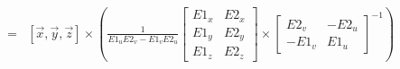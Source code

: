 \documentclass[12pt]{article}
\begin{document}
\begin{eqnarray*}
            & = &
            \left[ \overrightarrow{x}, \overrightarrow{y}, \overrightarrow{z} \right]       
            \times
            \left(
                \frac{1}{E1_uE2_v-E1_vE2_u}
                \left[ \begin{array}{cc}
                    E1_x & E2_x \\
                    E1_y & E2_y \\
                    E1_z & E2_z
                \end{array} \right]
                \times
                \left[ \begin{array}{cc}
                     E2_v & -E2_u \\
                    -E1_v &  E1_u
                \end{array} \right]^{-1}
            \right)
        \end{eqnarray*}
\end{document}
